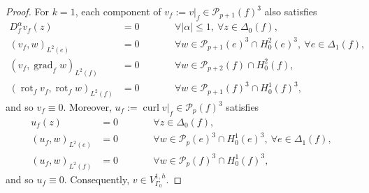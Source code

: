\documentclass{mcom-l}
\theoremstyle{definition}
\theoremstyle{remark}
\numberwithin{equation}{section}
\DeclareMathOperator{\curl}{curl}
\begin{document}
\begin{proof}
	For $k=1$, each component of 
	$v_f := v|_{f} \in \mathcal{P}_{p+1}(f)^3$ also satisfies 
	\begin{subequations}
		\label{eq:proof:Pp3-face-dofs}
		\begin{alignat}{2}
			D_f^{\alpha} v_f (z) &= 0 \qquad & &\forall |\alpha| \leq 1, 
			\ \forall z \in \Delta_0(f), \\
			(v_f, w)_{L^2(e)} &= 0 
			\qquad & &\forall w \in \mathcal{P}_{p+1}(e)^3 \cap H^2_0(e)^3, \ 
			\forall e \in \Delta_1(f),  \\
			\label{eq:proof:Pp3-face-dofs-interior-face}
			(v_f, \operatorname{grad}_f w)_{L^2(f)} &=0 
			\qquad & &\forall w \in \mathcal{P}_{p+2}(f) \cap H^2_0(f),\\
			(\operatorname{rot}_fv_f, \operatorname{rot}_fw)_{L^2(f)} &=0 
			\qquad & &\forall w \in \mathcal{P}_{p+1}(f)^3 \cap H^1_0(f)^3,
		\end{alignat}	
	\end{subequations}	 and so 
	$v_f \equiv 0$. Moreover, $u_f := \curl v|_f
	\in \mathcal{P}_p(f)^3$ satisfies	
	\begin{subequations}
		\label{eq:proof:Pp-face-dofs}
		\begin{alignat}{2}
			u_f (z) &= 0 
			\qquad & &\forall z \in \Delta_0(f), \\
			(u_f, w)_{L^2(e)} &= 0 
			\qquad & &\forall w \in \mathcal{P}_{p}(e)^3 
			\cap H^1_0(e)^3, \ \forall e \in \Delta_1(f), \\
			(u_f, w)_{L^2(f)} &=0 
			\qquad & &\forall w \in \mathcal{P}_{p}(f)^3 
			\cap H^1_0(f)^3,
		\end{alignat}	
	\end{subequations}
	and so $u_f \equiv 0$. Consequently, $v \in V_{\Gamma_0}^{1, h}$.
\end{proof}
\end{document}
